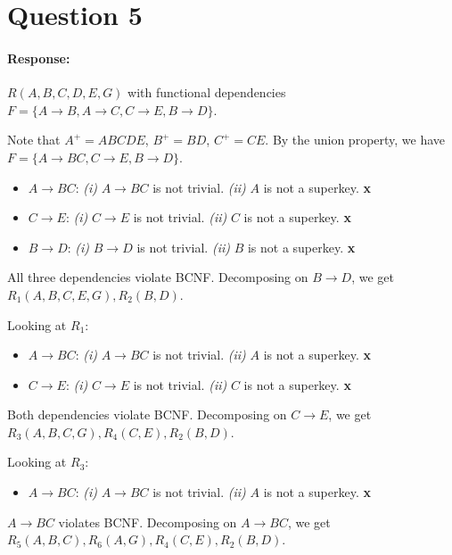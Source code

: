 \documentclass{report}
\renewcommand{\it}[1]{\textit{{#1}}}
\renewcommand{\bf}[1]{\textbf{{#1}}}
\newenvironment{response}{\begin{responseframe}\vspace{-10pt}\paragraph{Response:}}{\end{responseframe}}
\begin{document}
\newpage
\section*{Question 5}
\begin{response}
    $R(A, B, C, D, E, G)$ with functional dependencies $F = \{A \to B, A \to C, C \to E, B \to D\}$. \vspace{1em}

    \noindent Note that $A^+ = ABCDE$, $B^+ = BD$, $C^+ = CE$.
    By the union property, we have $F = \{A \to BC, C \to E, B \to D\}$.

    \begin{itemize}[itemsep=0em]
        \item $A \to BC$: \it{(i)} $A \to BC$ is not trivial. \it{(ii)} $A$ is not a superkey. \textsf{\bf{x}}
        \item $C \to E$: \it{(i)} $C \to E$ is not trivial. \it{(ii)} $C$ is not a superkey. \textsf{\bf{x}}
        \item $B \to D$: \it{(i)} $B \to D$ is not trivial. \it{(ii)} $B$ is not a superkey. \textsf{\bf{x}}
    \end{itemize}
    \noindent All three dependencies violate BCNF. Decomposing on $B \to D$, we get
    $R_1(A, B, C, E, G), R_2(B, D)$.

    \vspace{0.5em}

    \noindent Looking at $R_1$:
    \begin{itemize}[itemsep=0em]
        \item $A \to BC$: \it{(i)} $A \to BC$ is not trivial. \it{(ii)} $A$ is not a superkey. \textsf{\bf{x}}
        \item $C \to E$: \it{(i)} $C \to E$ is not trivial. \it{(ii)} $C$ is not a superkey. \textsf{\bf{x}}
    \end{itemize}
    \noindent Both dependencies violate BCNF. Decomposing on $C \to E$, we get
    $R_3(A, B, C, G), R_4(C, E), R_2(B, D)$.

    \vspace{0.5em}

    \noindent Looking at $R_3$:
    \begin{itemize}[itemsep=0em]
        \item $A \to BC$: \it{(i)} $A \to BC$ is not trivial. \it{(ii)} $A$ is not a superkey. \textsf{\bf{x}}
    \end{itemize}
    \noindent $A \to BC$ violates BCNF. Decomposing on $A \to BC$, we get
    $R_5(A, B, C), R_6(A, G), R_4(C, E), R_2(B, D)$.
    \vspace{1em}
    

\end{response}
\end{document}

